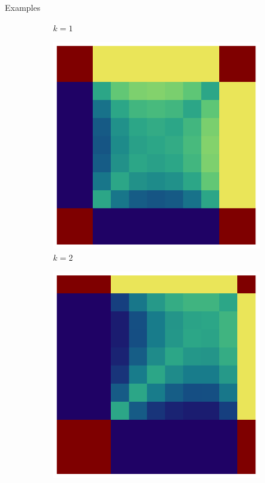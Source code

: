 \documentclass{beamer}
\theoremstyle{definition}
\begin{document}
\begin{frame}[shrink=10]{Examples}
\begin{figure}[H]
\begin{subfigure}[b]{0.185\textwidth}
        \caption{$k=1$}
        \label{fig:ppkBG_4_1}
    \end{subfigure}
    \hspace{0.00\textwidth} %
    \begin{subfigure}[b]{0.185\textwidth}
        \includegraphics[width=\textwidth]{img/ppkB_Plot_4_2_10.pdf}
        \caption{$k=2$}
        \label{fig:ppkBG_4_2}
    \end{subfigure}
    \hspace{0.00\textwidth} %
        \begin{subfigure}[b]{0.185\textwidth}
        \includegraphics[width=\textwidth]{img/ppkB_Plot_4_3_10.pdf}

\end{subfigure}
\end{figure}
\end{frame}
\end{document}
